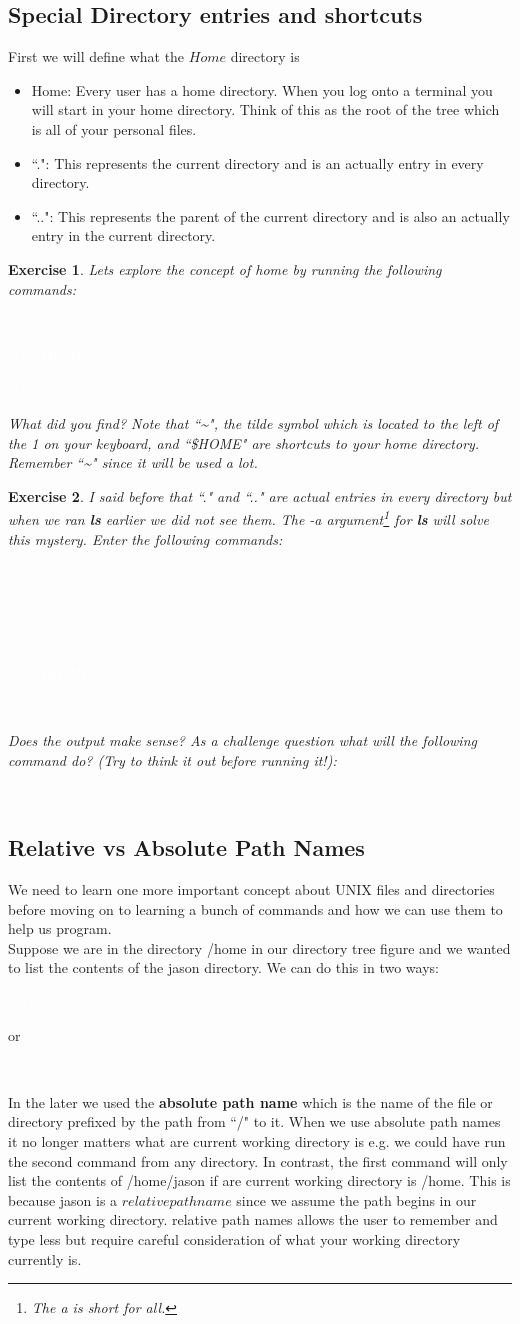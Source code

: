 \documentclass{book}
\newcommand{\commandline}[1]{\begin{center} \colorbox{Dark}{\textcolor{white}{#1}} \end{center}}
\newtheorem{ex}{Exercise}[chapter]
\begin{document}
\subsection{Special Directory entries and shortcuts}
First we will define what the $Home$ directory is
\begin{itemize}
	\item Home: Every user has a home directory. When you log onto a terminal you will start in your home directory. Think of this as the root of the tree which is all of your personal files.
	\item ``.": This represents the current directory and is an actually entry in every directory.
	\item ``..": This represents the parent of the current directory and is also an actually entry in the current directory.
\end{itemize}

\begin{ex} 
	Lets explore the concept of home by running the following commands:
	\commandline{pwd}
	\commandline{echo \$HOME}
	\commandline{echo \~{} }
	What did you find? Note that ``\~{}", the tilde symbol which is located to the left of the 1 on your keyboard, and ``\$HOME" are shortcuts to your home directory. Remember ``\~{}" since it will be used a lot.
\end{ex}
\begin{ex}
	I said before that ``." and ``.." are actual entries in every directory but when we ran \textbf{ls} earlier we did not see them. The -a argument\footnote{The a is short for all.} for \textbf{ls} will solve this mystery. Enter the following commands:
	\commandline{ls -a}
	\commandline{ls -a .}
	\commandline{ls -a \~{}}
	\commandline{ls -a \$HOME}
	\commandline{ls ..}
Does the output make sense? As a challenge question what will the following command do? (Try to think it out before running it!):
	\commandline{ls ././././}
\end{ex}

\subsection{Relative vs Absolute Path Names}
We need to learn one more important concept about UNIX files and directories before moving on to learning a bunch of commands and how we can use them to help us program. \\
Suppose we are in the directory /home in our directory tree figure and we wanted to list the contents of the jason directory. We can do this in two ways:
\commandline{ls jason}
or
\commandline{ls /home/jason}
In the later we used the \textbf{absolute path name} which is the name of the file or directory prefixed by the path from ``/" to it. When we use absolute path names it no longer matters what are current working directory is e.g. we could have run the second command from any directory. In contrast, the first command will only list the contents of /home/jason if are current working directory is /home. This is because jason is a $relative path name$ since we assume the path begins in our current working directory. relative path names allows the user to remember and type less but require careful consideration of what your working directory currently is. 
\end{document}
